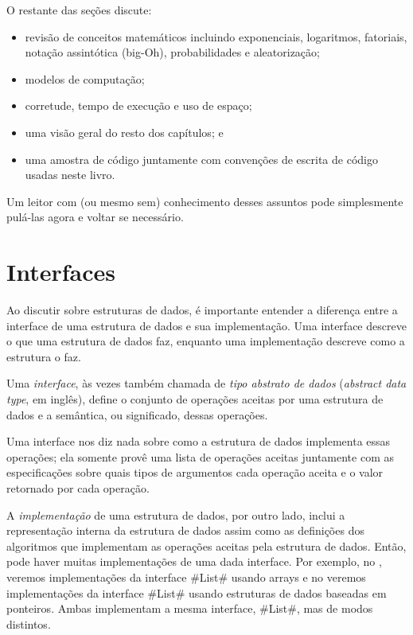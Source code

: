 O restante das seções discute:

\begin{itemize}
  \item revisão de conceitos matemáticos incluindo exponenciais, logaritmos, fatoriais, notação assintótica (big-Oh), probabilidades e aleatorização;
  \item modelos de computação;
  \item corretude, tempo de execução e uso de espaço;
  \item uma visão geral do resto dos capítulos; e 
  \item uma amostra de código juntamente com convenções de escrita de código usadas neste livro.
\end{itemize}

Um leitor com (ou mesmo sem) conhecimento desses assuntos pode simplesmente pulá-las agora e voltar se necessário.

\section{Interfaces}
Ao discutir sobre estruturas de dados, é importante entender a diferença entre a interface de uma estrutura de dados e sua implementação. 
Uma interface descreve o que uma estrutura de dados faz, enquanto uma implementação descreve como a estrutura o faz.

Uma \emph{interface},
%
%
às vezes também chamada de \emph{tipo abstrato de dados} (\emph{abstract data type}, em inglês),
define o conjunto de operações aceitas por uma estrutura de dados e a semântica, ou significado, dessas operações.

Uma interface nos diz nada sobre como a estrutura de dados implementa essas operações; ela somente provê uma lista de operações aceitas juntamente com as especificações sobre quais tipos de argumentos cada operação aceita e o valor retornado por cada operação.

A \emph{implementação} de uma estrutura de dados, por outro lado, inclui a representação interna da estrutura de dados assim como as definições dos algoritmos que implementam as operações aceitas pela estrutura de dados. 
Então, pode haver muitas implementações de uma dada interface.
Por exemplo, no , veremos implementações da interface #List# usando arrays e no  veremos implementações da interface #List# usando estruturas de dados baseadas em ponteiros. Ambas implementam a mesma interface, #List#, mas de modos distintos.

